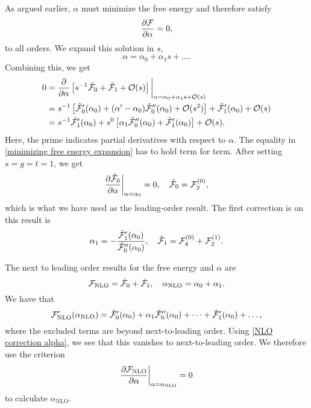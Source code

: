 %
As argued earlier, $\alpha$ must minimize the free energy and therefore satisfy
%
\begin{equation}
    \pdv{\mathcal{F}}{\alpha} = 0,
\end{equation}
%
to all orders.
We expand this solution in $s$,
\begin{equation}
    \alpha = \alpha_0 + \alpha_1 s + \dots.
\end{equation}
%
Combining this, we get
%
\begin{align}
    \nonumber
    0 &
    = 
    \pdv{}{\alpha}
    \left[
        s^{-1}\tilde {\mathcal{F}}_0
        + 
        \tilde {\mathcal{F}}_1
        +
        \mathcal O(s)
    \right]
    \bigg|_{\alpha=\alpha_0 + \alpha_1 s + \mathcal O(s)} 
    \\ \nonumber
    & = 
    s^{-1 }
    \left[
        \tilde {\mathcal{F}}_0'(\alpha_0)
        +
        (\alpha' - \alpha_0)
        \tilde {\mathcal{F}}_0''(\alpha_0)
        +
        \mathcal O(s^2)
    \right]
    +
    \tilde{\mathcal{F}}_1'(\alpha_0)
    +
    \mathcal O(s) \\
    &
    =
    s^{-1} \tilde{\mathcal{F}}_1'(\alpha_0)
    + s^{0}
    \left[
        \alpha_1
        \tilde {\mathcal{F}}_0''(\alpha_0)
        +
    \tilde{\mathcal{F}}_1'(\alpha_0)
    \right]
    +
    \mathcal O(s).
    \label{minimizing free energy expansion}
\end{align}
%
Here, the prime indicates partial derivatives with respect to $\alpha$.
The equality in \autoref{minimizing free energy expansion} has to hold term for term.
After setting $s = g = t = 1$, we get
%
\begin{align*}
    \pdv{\tilde {\mathcal{F}}_0}{\alpha}\bigg|_{\alpha=\alpha_0} = 0, \quad
    \tilde {\mathcal{F}}_0 = \mathcal{F}_2^{(0)},
\end{align*}
%
which is what we have used as the leading-order result. 
The first correction is on this result is
%
\begin{equation}
    \label{NLO correction alpha}
    \alpha_1 = - \frac{\tilde {\mathcal{F}}_1'(\alpha_0)}{{\tilde {\mathcal{F}}_0''(\alpha_0)}},
    \quad 
    \tilde {\mathcal{F}}_1 = \mathcal{F}_{4}^{(0)} + \mathcal{F}_{2}^{(1)}.
\end{equation}
%

The next to leading order results for the free energy and $\alpha$ are
%
\begin{equation}
    \mathcal{F}_\mathrm{NLO} = \tilde {\mathcal{F}}_0 + \tilde {\mathcal{F}}_1, \quad
    \alpha_\mathrm{NLO} = \alpha_0 + \alpha_1.
\end{equation}
%
We have that
%
\begin{equation}
    \mathcal{F}_\mathrm{NLO}'(\alpha_\mathrm{NLO})
    = \tilde {\mathcal{F}}_0'(\alpha_0) + \alpha_1 \tilde {\mathcal{F}}_0''(\alpha_0) + \dots
    + \tilde {\mathcal{F}}_1'(\alpha_0) + \dots,
\end{equation}
%
where the excluded terms are beyond next-to-leading order.
Using \autoref{NLO correction alpha}, we see that this vanishes to next-to-leading order.
We therefore use the criterion
%
\begin{equation}
    \label{alpha nlo method 2}
    \pdv{\mathcal{F}_\mathrm{NLO}}{\alpha} \bigg|_{\alpha=\alpha_{\mathrm{NLO}}} = 0
\end{equation}
%
to calculate $\alpha_\text{NLO}$.

